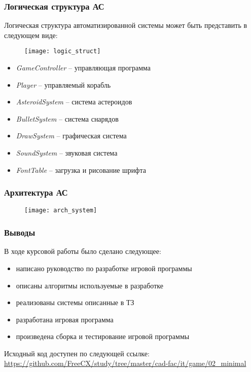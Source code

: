 \begin{frame}
    \frametitle{Логическая структура АС}
    Логическая структура автоматизированной системы может быть представить в следующем виде:
    \begin{figure}
        \texttt{[image: logic\_struct]}
    \end{figure}
    \begin{itemize}
        \small
        \item \emph{GameController} -- управляющая программа
        \item \emph{Player} -- управляемый корабль
        \item \emph{AsteroidSystem} -- система астероидов
        \item \emph{BulletSystem} -- система снарядов
        \item \emph{DrawSystem} -- графическая система
        \item \emph{SoundSystem} -- звуковая система
        \item \emph{FontTable} -- загрузка и рисование шрифта
    \end{itemize}
\end{frame}

\begin{frame}
    \frametitle{Архитектура АС}
    \begin{figure}
        \texttt{[image: arch\_system]}
    \end{figure}
\end{frame}

\begin{frame}
    \frametitle{Выводы}

    В ходе курсовой работы было сделано следующее:
    \begin{itemize}
        \item написано руководство по разработке игровой программы
        \item описаны алгоритмы используемые в разработке
        \item реализованы системы описанные в ТЗ
        \item разработана игровая программа
        \item произведена сборка и тестирование игровой программы
    \end{itemize}

    \vspace*{3em}
    Исходный код доступен по следующей ссылке: \scriptsize
    \url{https://github.com/FreeCX/study/tree/master/cad-fac/it/game/02_minimal}
\end{frame}

